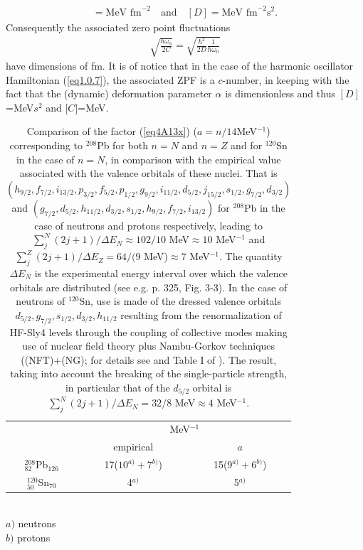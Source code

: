 \begin{align*}
[C]=\text{MeV fm}^{-2}\quad\text{and}\quad [D]=\text{MeV fm}^{-2}\text{s}^2.
\end{align*}
Consequently the associated zero point fluctuations
\begin{align}\label{eq4A18}
\sqrt{\frac{\hbar\omega_0}{2C}}=\sqrt{\frac{\hbar^2}{2D}\frac{1}{\hbar\omega_0}}
\end{align}
have dimensions of fm. It is of notice that in the case of the harmonic oscillator Hamiltonian (\ref{eq1.0.7}), the associated ZPF is a $c$-number, in keeping with the fact that the (dynamic) deformation parameter $\alpha$ is dimensionless and thus $[D]$=MeV$s^2$ and [$C$]=MeV. 
    \begin{table}
    \centering
    \begin{tabular}{|c|c|c|}
\hline
&\multicolumn{2}{c|}{MeV$^{-1}$}\\
\cline{2-3}
&empirical& $a$\\
\hline
$^{208}_{82}$Pb$_{126}$& 17($10^{a)}+7^{b)}$)& 15($9^{a)}+6^{b)}$)\\
\hline
$^{120}_{50}$Sn$_{70}$& 4$^{a)}$& 5$^{a)}$\\
\hline
    \end{tabular}\\$a)$ neutrons\\$b)$ protons\\\caption{
    Comparison of the factor (\ref{eq4A13x}) ($a=n/14$MeV$^{-1}$) corresponding to $^{208}$Pb for both $n=N$ and $n=Z$ and for $^{120}$Sn in the case of $n=N$, in comparison with the empirical value associated with the valence orbitals of these nuclei. That is $(h_{9/2},f_{7/2},i_{13/2},p_{3/2},f_{5/2},p_{1/2},g_{9/2},i_{11/2},d_{5/2},j_{15/2},s_{1/2},g_{7/2},d_{3/2})$ and $(g_{7/2},d_{5/2},h_{11/2},d_{3/2},s_{1/2},h_{9/2},f_{7/2},i_{13/2})$ for $^{208}$Pb in the case of neutrons and protons respectively, leading to $\sum_j^N(2j+1)/\Delta E_N\approx102/10$ MeV$\approx10$ MeV$^{-1}$ and $\sum_j^Z(2j+1)/\Delta E_Z=64/(9$ MeV)$\approx7$ MeV$^{-1}$. The quantity $\Delta E_N$ is the experimental energy interval over which the valence orbitals are distributed (see e.g. \cite{Bohr:69} p. 325, Fig. 3-3). In the case of neutrons of $^{120}$Sn, use is made of the dressed valence orbitals $d_{5/2},g_{7/2},s_{1/2},d_{3/2},h_{11/2}$ resulting from the renormalization of HF-Sly4 levels through the coupling of collective modes making use of nuclear field theory plus Nambu-Gorkov techniques ((NFT)+(NG); for details see \cite{Idini:15} and Table I of \cite{Potel:17}). The result, taking into account the breaking of the single-particle strength, in particular that of the $d_{5/2}$ orbital is $\sum_j^N(2j+1)/\Delta E_N=32/8$ MeV$\approx4$ MeV$^{-1}$.}\label{tab4A1}
    \end{table}
 
